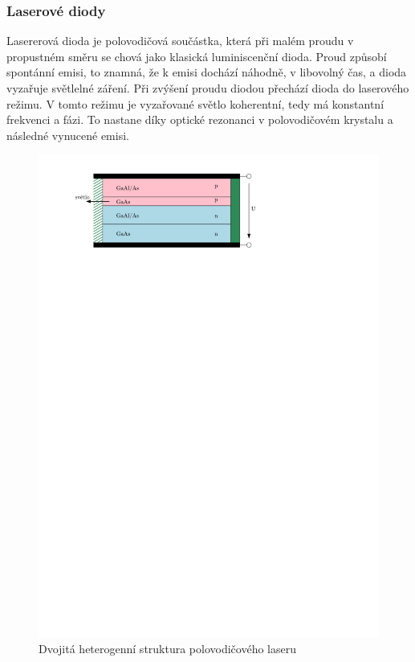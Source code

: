 \subsubsection{Laserové diody}
Lasererová dioda je polovodičová součástka, která při malém proudu v propustném směru se chová jako klasická luminiscenční dioda. Proud způsobí spontánní emisi, to znamná, že k emisi dochází náhodně, v libovolný čas, a dioda vyzařuje světlelné záření. Při zvýšení proudu diodou přechází dioda do laserového režimu. V tomto režimu je vyzařované světlo koherentní, tedy má konstantní frekvenci a fázi. To nastane díky optické rezonanci v polovodičovém krystalu a následné vynucené emisi.

\begin{figure}[H]
    \begin{center}
        \includegraphics[scale=1]{img/laser}
    \end{center}
    \caption{Dvojitá heterogenní struktura polovodičového laseru}
\end{figure}

